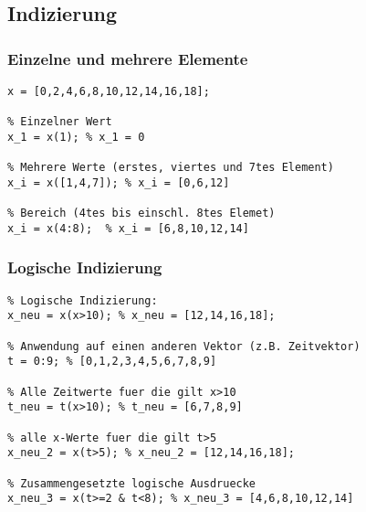 \documentclass[threecolumn, 5pt, german]{latex4ei/latex4ei_sheet}
\begin{document}
	\begin{sectionbox}
	
		\subsection{Indizierung}
		
		\subsubsection{Einzelne und mehrere Elemente}
		
		\begin{lstlisting}
x = [0,2,4,6,8,10,12,14,16,18];

% Einzelner Wert
x_1 = x(1); % x_1 = 0

% Mehrere Werte (erstes, viertes und 7tes Element)
x_i = x([1,4,7]); % x_i = [0,6,12]

% Bereich (4tes bis einschl. 8tes Elemet)
x_i = x(4:8);  % x_i = [6,8,10,12,14]
		\end{lstlisting}

		\subsubsection{Logische Indizierung}
		\begin{lstlisting}
% Logische Indizierung:
x_neu = x(x>10); % x_neu = [12,14,16,18];

% Anwendung auf einen anderen Vektor (z.B. Zeitvektor)
t = 0:9; % [0,1,2,3,4,5,6,7,8,9]

% Alle Zeitwerte fuer die gilt x>10
t_neu = t(x>10); % t_neu = [6,7,8,9]

% alle x-Werte fuer die gilt t>5
x_neu_2 = x(t>5); % x_neu_2 = [12,14,16,18];

% Zusammengesetzte logische Ausdruecke
x_neu_3 = x(t>=2 & t<8); % x_neu_3 = [4,6,8,10,12,14]
		\end{lstlisting}
	\end{sectionbox}
	
\end{document}
